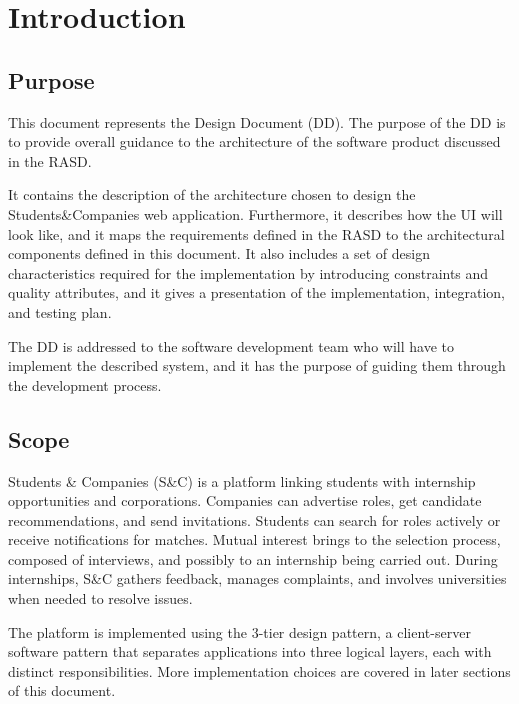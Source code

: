 \chapter{Introduction}

\section{Purpose}
This document represents the Design Document (DD). The purpose of the DD is to provide overall guidance to the architecture of the software product discussed in the RASD.

It contains the description of the architecture chosen to design the Students\&Companies web application. Furthermore, it describes how the UI will look like, and it maps the requirements defined in the RASD to the architectural components defined in this document.
It also includes a set of design characteristics required for the implementation by introducing constraints and quality attributes, and it gives a presentation of the implementation, integration, and testing plan.

The DD is addressed to the software development team who will have to implement the described system, and it has the purpose of guiding them through the development process.


\section{Scope}
Students \& Companies (S\&C) is a platform linking students with internship opportunities and corporations. Companies can advertise roles, get candidate recommendations, and send invitations. Students can search for roles actively or receive notifications for matches. Mutual interest brings to the selection process, composed of interviews, and possibly to an internship being carried out. During internships, S\&C gathers feedback, manages complaints, and involves universities when needed to resolve issues.

The platform is implemented using the 3-tier design pattern, a client-server software pattern that separates applications into three logical layers, each with distinct responsibilities.  
More implementation choices are covered in later sections of this document.


\pagebreak
